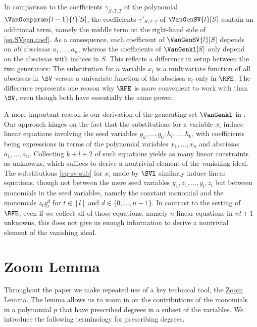 \documentclass{toc}
\begin{document}
In comparison to the coefficients $\gamma_{S \setminus T, T}$ of the polynomial $\VanGenparam{l-1}{l}[S]$, the coefficients $\gamma'_{S \setminus T, T}$ of $\VanGenSV{l}[S]$ contain an additional term, namely the middle term on the right-hand side of \eqref{eq.SVgen.coef}. As a consequence, each coefficient of $\VanGenSV{l}[S]$ depends on \emph{all} abscissas $a_1,\dots,a_n$, whereas the coefficients of $\VanGenkl[S]$ only depend on the abscissas with indices in $S$. This reflects a difference in setup between the two generators: The substitution for a variable $x_i$ is a multivariate function of all abscissas in $\SV$ versus a univariate function of the abscissa $a_i$ only in $\RFE$. The difference represents one reason why $\RFE$ is more convenient to work with than $\SV$, even though both have essentially the same power.

A more important reason is our derivation of the generating set $\VanGenkl$ in . Our approach hinges on the fact that the substitutions for a variable $x_i$ induce linear equations involving the seed variables $g_{k},\dots,g_{0},h_{l},\dots,h_{0}$, with coefficients being expressions in terms of the polynomial variables $x_1,\dots,x_n$ and abscissas $a_1,\dots,a_n$. Collecting $k+l+2$ of such equations yields as many linear constraints as unknowns, which suffices to derive a nontrivial element of the vanishing ideal. The substitutions \eqref{eq-sv-sub} for $x_i$ made by $\SVl$ similarly induce linear equations, though not between the mere seed variables $y_1, z_1, \dots, y_l, z_l$ but between monomials in the seed variables, namely the constant monomial and the monomials $z_t y_t^d$ for $t\in [l]$ and $d\in \{0,\dots,n-1\}$. In contrast to the setting of $\RFE$, even if we collect all of those equations, namely $n$ linear equations in $nl+1$ unknowns, this does not give us enough information to derive a nontrivial element of the vanishing ideal.

\section{Zoom Lemma}
\label{s.zoom}

Throughout the paper we make repeated use of a key technical tool,
the \hyperref[lem.multi-zsub-deriv]{Zoom Lemma}.
The lemma allows us to zoom in on the contributions of the monomials in a
polynomial $p$ that have prescribed degrees in a subset of the variables.
We introduce the following terminology for prescribing degrees.
\end{document}
